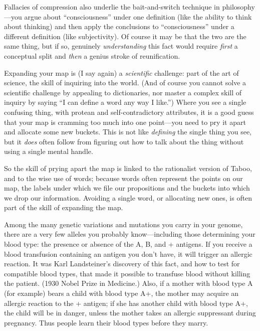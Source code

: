 {
 Fallacies of compression also underlie the bait-and-switch
technique in philosophy---you argue about
``consciousness'' under one
definition (like the ability to think about thinking) and then apply
the conclusions to ``consciousness''
under a different definition (like subjectivity). Of course it may be
that the two are the same thing, but if so, genuinely
\textit{understanding} this fact would require \textit{first} a
conceptual split and \textit{then} a genius stroke of reunification.}

{
 Expanding your map is (I say again) a \textit{scientific}
challenge: part of the art of science, the skill of inquiring into the
world. (And of course you cannot solve a scientific challenge by
appealing to dictionaries, nor master a complex skill of inquiry by
saying ``I can define a word any way I
like.'') Where you see a single confusing thing, with
protean and self-contradictory attributes, it is a good guess that your
map is cramming too much into one point---you need to pry it apart and
allocate some new buckets. This is not like \textit{defining} the
single thing you see, but it \textit{does} often follow from figuring
out how to talk about the thing without using a single mental handle.}

{
 So the skill of prying apart the map is linked to the rationalist
version of Taboo, and to the wise use of words; because words often
represent the points on our map, the labels under which we file our
propositions and the buckets into which we drop our information.
Avoiding a single word, or allocating new ones, is often part of the
skill of expanding the map.}

\myendsectiontext


{
 Among the many genetic variations and mutations you carry in your
genome, there are a very few alleles you probably know---including
those determining your blood type: the presence or absence of the A, B,
and + antigens. If you receive a blood transfusion containing an
antigen you don't have, it will trigger an allergic
reaction. It was Karl Landsteiner's discovery of this
fact, and how to test for compatible blood types, that made it possible
to transfuse blood without killing the patient. (1930 Nobel Prize in
Medicine.) Also, if a mother with blood type A (for example) bears a
child with blood type A+, the mother may acquire an allergic reaction
to the + antigen; if she has another child with blood type A+, the
child will be in danger, unless the mother takes an allergic
suppressant during pregnancy. Thus people learn their blood types
before they marry. }

